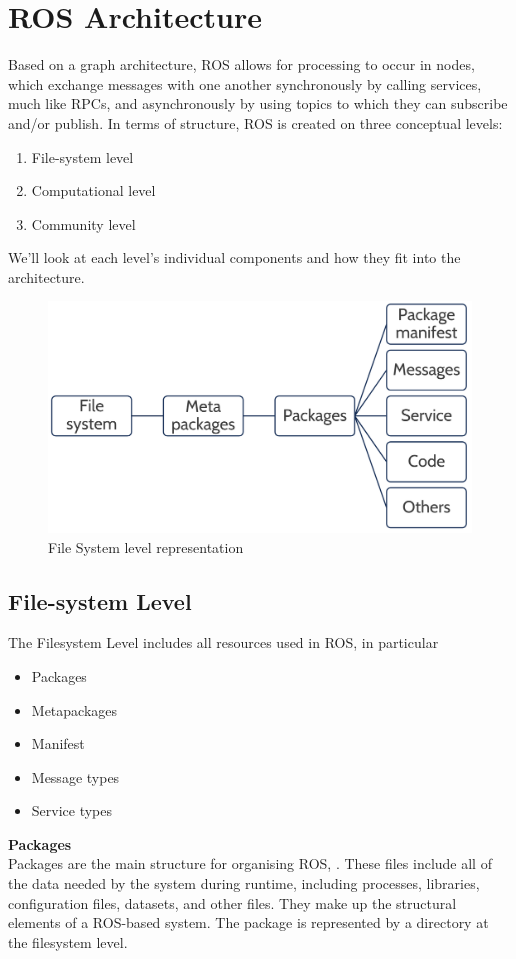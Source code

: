 \section{ROS Architecture}
Based on a graph architecture, ROS allows for processing to occur in nodes, which exchange messages with one another synchronously by calling services, much like RPCs, and asynchronously by using topics to which they can subscribe and/or publish. In terms of structure, ROS is created on three conceptual levels:
\begin{enumerate}
    \item File-system level
    \item Computational level
    \item Community level
\end{enumerate}
We'll look at each level's individual components and how they fit into the architecture.
\begin{figure}[H]
    \centering
    \includegraphics[scale=0.35]{Images/Chapter 2/Filesystem.png}
    \caption{File System level representation}
    \label{fig:Filesystem}
\end{figure}
\subsection{File-system Level}
The Filesystem Level includes all resources used in ROS, in particular
\begin{itemize}
    \item Packages
    \item Metapackages
    \item Manifest
    \item Message types
    \item Service types
\end{itemize}

\textbf{Packages}\\
Packages are the main structure for organising ROS, \citet{rospackages}. These files include all of the data needed by the system during runtime, including processes, libraries, configuration files, datasets, and other files. They make up the structural elements of a ROS-based system. The package is represented by a directory at the filesystem level. 

